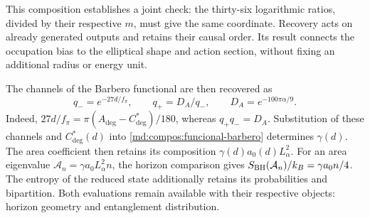This composition establishes a joint check: the thirty-six logarithmic
ratios, divided by their respective \(m\), must give the same coordinate.
Recovery acts on already generated outputs and retains their causal order.
Its result connects the occupation bias to the elliptical shape and
action section, without fixing an additional radius or energy unit.

The channels of the Barbero functional are then recovered as
\[
 q_-=e^{-27d/f_\pi},\qquad
 q_+=D_A/q_-,\qquad D_A=e^{-100\pi\alpha/9}.
\]
Indeed, \(27d/f_\pi=\pi(A_{\deg}-C^*_{\deg})/180\), whereas
\(q_+q_-=D_A\). Substitution of these channels and \(C^*_{\deg}(d)\)
into \eqref{md:compos:funcional-barbero} determines \(\gamma(d)\).
The area coefficient then retains its composition
\(\gamma(d)a_0(d)L_\alpha^2\). For an area eigenvalue
\(\mathcal A_n=\gamma a_0L_\alpha^2n\), the horizon comparison gives
\(S_{\rm BH}(\mathcal A_n)/k_B=\gamma a_0n/4\).
The entropy of the reduced state additionally retains its probabilities
and bipartition. Both evaluations remain available with their respective
objects: horizon geometry and entanglement distribution.

